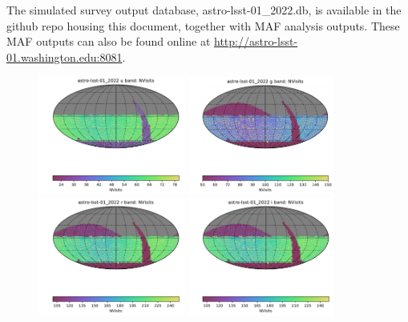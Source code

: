 \documentclass[DM,lsstdraft,authoryear,toc]{lsstdoc}
\begin{document}
The simulated survey output database, astro-lsst-01\_2022.db, is available in the github repo housing this document, together with MAF analysis outputs. These MAF outputs can also be found online at \url{http://astro-lsst-01.washington.edu:8081}.


\clearpage
\clearpage

\begin{figure}[ht]
\centering
\includegraphics[width=0.43\textwidth]{figures/astro-lsst-01_2022_NVisits_u_band_HEAL_SkyMap}
\includegraphics[width=0.43\textwidth]{figures/astro-lsst-01_2022_NVisits_g_band_HEAL_SkyMap} \\
\includegraphics[width=0.43\textwidth]{figures/astro-lsst-01_2022_NVisits_r_band_HEAL_SkyMap}
\includegraphics[width=0.43\textwidth]{figures/astro-lsst-01_2022_NVisits_i_band_HEAL_SkyMap} \\

\end{figure}
\end{document}
